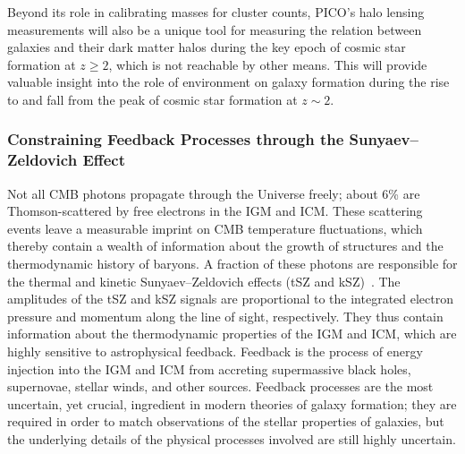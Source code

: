 \documentclass[PICOAPC.tex]{subfiles}
\begin{document}
Beyond its role in calibrating masses for cluster counts, PICO's halo lensing measurements will also be a unique tool for measuring the relation between galaxies and their dark matter halos during the key epoch of cosmic star formation at $z\geq 2$, which is not reachable by other means.  This will provide valuable insight into the role of environment on galaxy formation during the rise to and fall from the peak of cosmic star formation at $z\sim 2$. 



\subsubsection{Constraining Feedback Processes through the Sunyaev--Zeldovich Effect}
\label{sec:sz}



Not all CMB photons propagate through the Universe freely; about 6\% are Thomson-scattered by free electrons in the \ac{IGM} and \ac{ICM}.  These scattering events leave a measurable imprint on \ac{CMB} temperature fluctuations, which thereby contain a wealth of information about the growth of structures and the thermodynamic history of baryons. A fraction of these photons are responsible for the thermal and kinetic Sunyaev--Zeldovich effects (tSZ and kSZ)~\citep{zeldovich69,SZ1972}. The amplitudes of the tSZ and kSZ signals are proportional to the integrated electron pressure and momentum along the line of sight, respectively.  They thus contain information about the thermodynamic properties of the \ac{IGM} and \ac{ICM}, which are highly sensitive to astrophysical feedback. Feedback is the process of energy injection into the \ac{IGM} and \ac{ICM} from accreting supermassive black holes, supernovae, stellar winds, and other sources. Feedback processes are the most uncertain, yet crucial, ingredient in modern theories of galaxy formation; they are required in order to match observations of the stellar properties of galaxies, but the underlying details of the physical processes involved are still highly uncertain.
\end{document}
